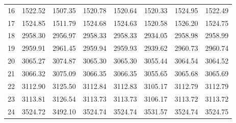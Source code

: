 \documentclass[10pt,oneside]{article}
\begin{document}
\begin{table}[h!]
\begin{tabular}{cccccccc}
16 &   1522.52 & 1507.35 & 1520.78 & 1520.64 &      1520.33 & 1524.95 & 1522.49 \\
17 &   1524.85 & 1511.79 & 1524.68 & 1524.63 &      1520.58 & 1526.20 & 1524.75 \\
18 &   2958.30 & 2956.97 & 2958.33 & 2958.33 &      2934.05 & 2958.98 & 2958.99 \\
19 &   2959.91 & 2961.45 & 2959.94 & 2959.93 &      2939.62 & 2960.73 & 2960.74 \\
20 &   3065.27 & 3074.87 & 3065.30 & 3065.30 &      3055.44 & 3064.54 & 3064.52 \\
21 &   3066.32 & 3075.09 & 3066.35 & 3066.35 &      3055.65 & 3065.68 & 3065.69 \\
22 &   3112.90 & 3125.50 & 3112.84 & 3112.83 &      3105.17 & 3112.79 & 3112.79 \\
23 &   3113.81 & 3126.54 & 3113.73 & 3113.73 &      3106.17 & 3113.72 & 3113.72 \\
24 &   3524.72 & 3492.10 & 3524.74 & 3524.74 &      3531.57 & 3524.74 & 3524.75 \\
\bottomrule
\end{tabular}
\end{table}

\clearpage
\end{document}
